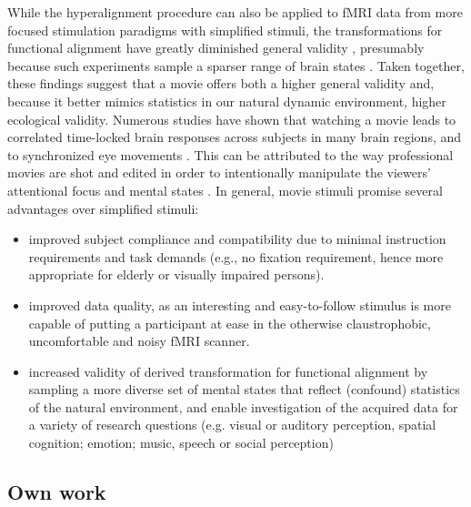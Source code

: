 %
While the hyperalignment procedure can also be applied to fMRI data from more
focused stimulation paradigms with simplified stimuli, the transformations for
functional alignment have greatly diminished general validity
\citep{haxby2011common}, presumably because such experiments sample a sparser
range of brain states \citep{guntupalli2016model}.
%
Taken together, these findings suggest that a movie offers both a higher general
validity and, because it better mimics statistics in our natural dynamic
environment, higher ecological validity. Numerous studies have shown that
watching a movie leads to correlated time-locked brain responses across subjects
in many brain regions, and to synchronized eye movements
\citep{hasson2010reliability, lankinen2014isc-meg}.
%
This can be attributed to the way professional movies are shot and edited in
order to intentionally manipulate the viewers' attentional focus and mental
states \citep{brown2012cinematography, dancyger2011film-technique}.
%
In general, movie stimuli promise several advantages over simplified stimuli:

\begin{itemize}
    \item improved subject compliance and compatibility due to
            minimal instruction requirements and task demands (e.g., no fixation
            requirement, hence more appropriate for elderly or visually impaired
        persons).
    \item improved data quality, as an interesting and
            easy-to-follow stimulus is more capable of putting a participant at
            ease in the otherwise claustrophobic, uncomfortable and noisy fMRI
        scanner.
    \item increased validity of derived transformation for
            functional alignment by sampling a more diverse set of mental states
            that reflect (confound) statistics of the natural environment, and
            enable investigation of the acquired data for a variety of research
            questions (e.g. visual or auditory perception, spatial cognition;
            emotion; music, speech or social perception)
\end{itemize}


\subsection{Own work}

